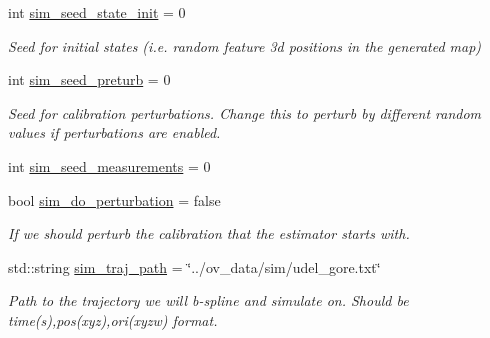 \begin{DoxyCompactItemize}
int \hyperlink{structov__init_1_1InertialInitializerOptions_a1737eab55d27c05b3663a6b4c908aa6f}{sim\+\_\+seed\+\_\+state\+\_\+init} = 0
\begin{DoxyCompactList}\small\item\em Seed for initial states (i.\+e. random feature 3d positions in the generated map) \end{DoxyCompactList}\item 
\mbox{\label{structov__init_1_1InertialInitializerOptions_aed93d59d66bf7d2f0778a09fb58a0a92}} 
int \hyperlink{structov__init_1_1InertialInitializerOptions_aed93d59d66bf7d2f0778a09fb58a0a92}{sim\+\_\+seed\+\_\+preturb} = 0
\begin{DoxyCompactList}\small\item\em Seed for calibration perturbations. Change this to perturb by different random values if perturbations are enabled. \end{DoxyCompactList}\item 
int \hyperlink{structov__init_1_1InertialInitializerOptions_a4974c2a72613c396477eb322bca919ea}{sim\+\_\+seed\+\_\+measurements} = 0
\item 
\mbox{\label{structov__init_1_1InertialInitializerOptions_af8d57aa321db8dc0a6ae5b5b99bfbd46}} 
bool \hyperlink{structov__init_1_1InertialInitializerOptions_af8d57aa321db8dc0a6ae5b5b99bfbd46}{sim\+\_\+do\+\_\+perturbation} = false
\begin{DoxyCompactList}\small\item\em If we should perturb the calibration that the estimator starts with. \end{DoxyCompactList}\item 
\mbox{\label{structov__init_1_1InertialInitializerOptions_aa8e988485f1a07e879d7a01e8e5b5ca3}} 
std\+::string \hyperlink{structov__init_1_1InertialInitializerOptions_aa8e988485f1a07e879d7a01e8e5b5ca3}{sim\+\_\+traj\+\_\+path} = \char`\"{}../ov\+\_\+data/sim/udel\+\_\+gore.\+txt\char`\"{}
\begin{DoxyCompactList}\small\item\em Path to the trajectory we will b-\/spline and simulate on. Should be time(s),pos(xyz),ori(xyzw) format. \end{DoxyCompactList}\item 

\end{DoxyCompactItemize}
